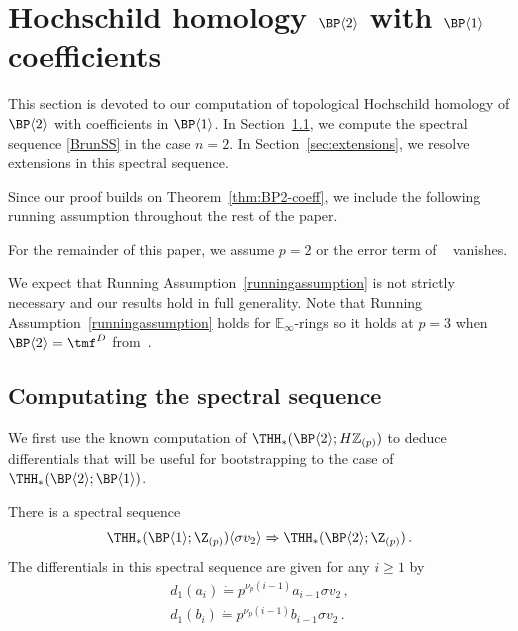 \section{Hochschild homology  \texorpdfstring{$\BP\langle 2\rangle$}{BP2} with \texorpdfstring{$\BP\langle 1\rangle$}{BP1} coefficients}\label{THH}
This section is devoted to our computation of topological Hochschild homology of $\BP\langle 2\rangle$ with coefficients in $\BP\langle 1\rangle$. In Section~\ref{sec:SS}, we compute the spectral sequence \eqref{BrunSS} in the case $n=2$. In Section~\ref{sec:extensions}, we resolve extensions in this spectral sequence. 

Since our proof builds on Theorem~\ref{thm:BP2-coeff}, we include the following running assumption throughout the rest of the paper. 
\begin{runningassumption}\label{runningassumption}
For the remainder of this paper, we assume $p=2$ or the error term of ~\cite[Equation (3-7)]{ACH24} vanishes.
\end{runningassumption}
\begin{remark}
We expect that Running Assumption~\ref{runningassumption} is not strictly necessary and our results hold in full generality. Note that  Running Assumption~\ref{runningassumption} holds for $\mathbb{E}_\infty$-rings so it holds at $p=3$ when $\BP\langle 2\rangle=\tmf^{D}$ from~\cite{HL10}. 
\end{remark}

\subsection{Computating the spectral sequence}\label{sec:SS}

We first use the known computation of $\THH_*(\BP\langle 2\rangle;H\mathbb{Z}_{(p)})$ to deduce differentials that will be useful for bootstrapping to the case of $\THH_*(\BP\langle 2\rangle;\BP\langle 1\rangle)$. 

\begin{proposition}
  There is a spectral sequence
  \[
    \THH_*(\BP\langle 1\rangle; \Z_{(p)}) \langle \sigma v_2 \rangle \Rightarrow \THH_*(\BP \langle 2 \rangle;\Z_{(p)}) \,.
  \]
The differentials in this spectral sequence are given for any $i \geq 1$ by
  \[
    \begin{gathered}
      d_1(a_i) \dot{=} p^{\nu_p(i-1)} a_{i-1} \sigma v_2 \,, \\
      d_1(b_i) \dot{=} p^{\nu_p(i-1)} b_{i-1} \sigma v_2 \,.
    \end{gathered}
  \]
\end{proposition}

